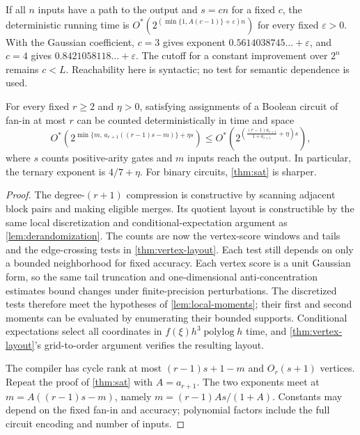 \documentclass[11pt]{article}
\theoremstyle{plain}
\theoremstyle{definition}
\theoremstyle{remark}
\begin{document}
\begin{corollary}
\label{cor:input-counting}
If all $n$ inputs have a path to the output and $s=cn$ for a fixed $c$, the deterministic
running time is $O^*(2^{(\min\{1,A(c-1)\}+\varepsilon)n})$ for every fixed $\varepsilon>0$.
With the Gaussian coefficient, $c=3$ gives exponent $0.5614038745\ldots+\varepsilon$, and
$c=4$ gives $0.8421058118\ldots+\varepsilon$. The cutoff for a constant improvement over
$2^n$ remains $c<L$. Reachability here is syntactic; no test for semantic dependence is used.
\end{corollary}

\begin{corollary}
\label{cor:ternary-counting}
\label{cor:degree-counting}
For every fixed $r\ge2$ and $\eta>0$, satisfying assignments of a Boolean circuit of fan-in
at most $r$ can be counted deterministically in time and space
\[
  O^*\!\left(2^{\min\{m,\,a_{r+1}((r-1)s-m)\}+\eta s}\right)
  \le O^*\!\left(2^{\left(\frac{(r-1)a_{r+1}}{1+a_{r+1}}+\eta\right)s}\right),
\]
where $s$ counts positive-arity gates and $m$ inputs reach the output. In particular,
the ternary exponent is $4/7+\eta$. For binary circuits, \cref{thm:sat} is sharper.
\end{corollary}

\begin{proof}
The degree-$(r+1)$ compression is constructive by scanning adjacent block pairs and making
eligible merges. Its quotient layout is constructible by the same local discretization
and conditional-expectation argument as \cref{lem:derandomization}. The counts are now the
vertex-score windows and tails and the edge-crossing tests in \cref{thm:vertex-layout}.
Each test still depends on only a bounded neighborhood for fixed accuracy. Each vertex
score is a unit Gaussian form, so the same tail truncation and one-dimensional
anti-concentration estimates bound changes under finite-precision perturbations.
The discretized tests therefore meet the hypotheses of \cref{lem:local-moments}; their
first and second moments can be evaluated by enumerating their bounded supports.
Conditional expectations select all coordinates in $f(\xi)h^3\operatorname{polylog}h$ time,
and \cref{thm:vertex-layout}'s grid-to-order argument verifies the resulting layout.

The compiler has cycle rank at most $(r-1)s+1-m$ and $O_r(s+1)$ vertices. Repeat the
proof of \cref{thm:sat} with $A=a_{r+1}$. The two exponents meet at
$m=A((r-1)s-m)$, namely $m=(r-1)As/(1+A)$. Constants may depend on the fixed fan-in
and accuracy; polynomial factors include the full circuit encoding and number of inputs.
\end{proof}
\end{document}
